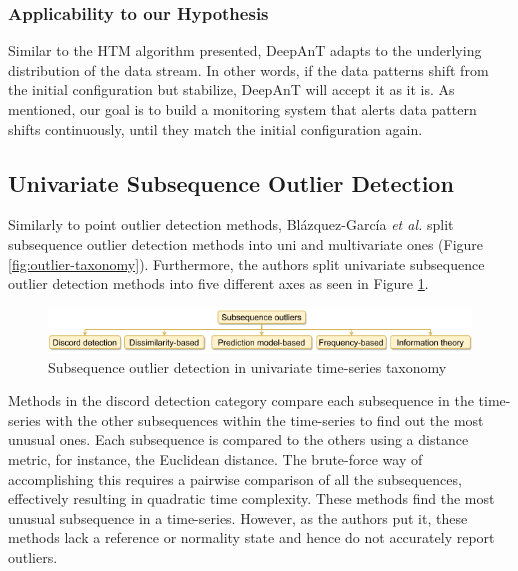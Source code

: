 \subsubsection*{Applicability to our Hypothesis}
Similar to the HTM algorithm presented, DeepAnT adapts to the underlying distribution of the data stream. In other words, if the data patterns shift from the initial configuration but stabilize, DeepAnT will accept it as it is. As mentioned, our goal is to build a monitoring system that alerts data pattern shifts continuously, until they match the initial configuration again.

\subsection{Univariate Subsequence Outlier Detection} \label{sec:uni-sub-out}
Similarly to point outlier detection methods, Blázquez-García \emph{et al.} \cite{Blazquez-Garcia-Review-Anomaly-Detection} split subsequence outlier detection methods into uni and multivariate ones (Figure \ref{fig:outlier-taxonomy}). Furthermore, the authors split univariate subsequence outlier detection methods into five different axes as seen in Figure \ref{fig:subsequence-outlier-taxonomy}.

\begin{figure}[!htb]
  \begin{center}
    \includegraphics[scale=0.8]{figures/taxonomy-subsequence-outlier-uni.png}
    \caption[Subsequence outlier detection in univariate time-series taxonomy]{Subsequence outlier detection in univariate time-series taxonomy \cite{Blazquez-Garcia-Review-Anomaly-Detection}}
    \label{fig:subsequence-outlier-taxonomy}
  \end{center}
\end{figure}

Methods in the discord detection category compare each subsequence in the time-series with the other subsequences within the time-series to find out the most unusual ones. Each subsequence is compared to the others using a distance metric, for instance, the Euclidean distance. The brute-force way of accomplishing this requires a pairwise comparison of all the subsequences, effectively resulting in quadratic time complexity. These methods find the most unusual subsequence in a time-series. However, as the authors put it, these methods lack a reference or normality state and hence do not accurately report outliers.

